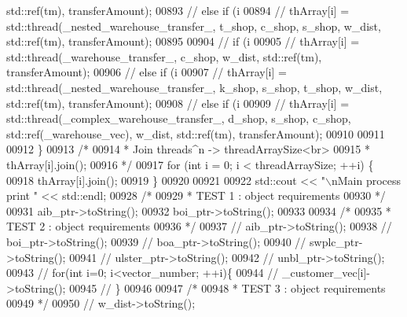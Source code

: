 \begin{DoxyCode}
{{{{{{{{{       std::ref(tm), transferAmount);}
00893         \textcolor{comment}{//        else if (i %
00894         \textcolor{comment}{//            thArray[i] = std::thread(\_nested\_warehouse\_transfer\_, t\_shop, c\_shop, s\_shop, w\_dist,
       std::ref(tm), transferAmount);}
00895 
00904         \textcolor{comment}{//        if (i %
00905         \textcolor{comment}{//            thArray[i] = std::thread(\_warehouse\_transfer\_, c\_shop, w\_dist, std::ref(tm),
       transferAmount);}
00906         \textcolor{comment}{//        else if (i %
00907         \textcolor{comment}{//            thArray[i] = std::thread(\_nested\_warehouse\_transfer\_, k\_shop, s\_shop, t\_shop, w\_dist,
       std::ref(tm), transferAmount);}
00908         \textcolor{comment}{//        else if (i %
00909         \textcolor{comment}{//            thArray[i] = std::thread(\_complex\_warehouse\_transfer\_, d\_shop, s\_shop, c\_shop,
       std::ref(\_warehouse\_vec), w\_dist, std::ref(tm), transferAmount);}
00910 
00911 
00912     \}
00913     \textcolor{comment}{/*}
00914 \textcolor{comment}{     * Join threads^n -> threadArraySize<br>}
00915 \textcolor{comment}{     * thArray[i].join();}
00916 \textcolor{comment}{     */}
00917     \textcolor{keywordflow}{for} (\textcolor{keywordtype}{int} i = 0; i < threadArraySize; ++i) \{
00918         thArray[i].join();
00919     \}
00920 
00921 
00922     std::cout << \textcolor{stringliteral}{"\(\backslash\)nMain process print "} << std::endl;
00928     \textcolor{comment}{/*}
00929 \textcolor{comment}{     * TEST 1 : object requirements}
00930 \textcolor{comment}{     */}
00931     aib\_ptr->toString();
00932     boi\_ptr->toString();
00933 
00934     \textcolor{comment}{/*}
00935 \textcolor{comment}{     * TEST 2 : object requirements }
00936 \textcolor{comment}{     */}
00937     \textcolor{comment}{//    aib\_ptr->toString();}
00938     \textcolor{comment}{//    boi\_ptr->toString();}
00939     \textcolor{comment}{//    boa\_ptr->toString();}
00940     \textcolor{comment}{//    swplc\_ptr->toString();}
00941     \textcolor{comment}{//    ulster\_ptr->toString();}
00942     \textcolor{comment}{//    unbl\_ptr->toString();}
00943     \textcolor{comment}{//    for(int i=0; i<vector\_number; ++i)\{}
00944     \textcolor{comment}{//        \_customer\_vec[i]->toString();}
00945     \textcolor{comment}{//    \}}
00946 
00947     \textcolor{comment}{/*}
00948 \textcolor{comment}{     * TEST 3 : object requirements}
00949 \textcolor{comment}{     */}
00950     \textcolor{comment}{//            w\_dist->toString();}
}}}}}}}}}}}}
\end{DoxyCode}
